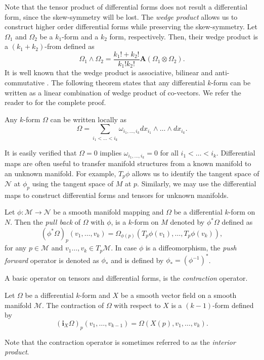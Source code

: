 Note that the tensor product of differential forms does not result a differential form, since the skew-symmetry will be lost. The \emph{wedge product} allows us to construct higher order differential forms while preserving the skew-symmetry. Let $\Omega_1$ and $\Omega_2$ be a $k_1$-form and a $k_2$ form, respectively. Then, their wedge product is a $(k_1+k_2)$-from defined as
\begin{equation} \label{eq:2.8}
	\Omega_1 \wedge \Omega_2 = \frac{k_1! + k_2!}{k_1!k_2!} \mathbf{A}(\Omega_1\otimes \Omega_2).
\end{equation}
It is well known that the wedge product is associative, bilinear and anti-commutative \cite{marsden2013introduction}. The following theorem states that any differential $k$-form can be written as a linear combination of wedge product of co-vectors. We refer the reader to \cite{} for the complete proof.
\begin{theorem} \label{theorem:2.2}
Any $k$-form $\Omega$ can be written locally as
\begin{equation} \label{eq:2.9}
	\Omega = \sum_{i_1<\dots<i_k} \omega_{i_1,\dots,i_k} dx_{i_1}\wedge\dots\wedge dx_{i_k}.
\end{equation}
\end{theorem}

It is easily verified that $\Omega = 0$ implies $\omega_{i_1,\dots,i_k} = 0$ for all $i_1<\dots<i_k$. Differential maps are often useful to transfer manifold structures from a known manifold to an unknown manifold. For example, $T_p\phi$ allows us to identify the tangent space of $\mathcal N$ at $\phi_p$ using the tangent space of $M$ at $p$. Similarly, we may use the differential maps to construct differential forms and tensors for unknown manifolds. 

\begin{definition}
Let $\phi:\mathcal M \to \mathcal N$ be a smooth manifold mapping and $\Omega$ be a differential $k$-form on $N$. Then the \emph{pull back} of $\Omega$ with $\phi$, is a $k$-form on $M$ denoted by $\phi^*\Omega$ defined as
\[
	(\phi^*\Omega)_p(v_1,\dots,v_k) = \Omega_{\phi(p)}( T_p\phi(v_1) , \dots , T_p\phi(v_k) ),
\]
for any $p\in \mathcal M$ and $v_1\dots,v_k \in T_p \mathcal M$. In case $\phi$ is a diffeomorphism, the \emph{push forward} operator is denoted as $\phi_*$ and is defined by $\phi_* = (\phi^{-1})^*$.
\end{definition}

A basic operator on tensors and differential forms, is the \emph{contraction} operator.
\begin{definition}
	Let $\Omega$ be a differential $k$-form and $X$ be a smooth vector field on a smooth manifold $\mathcal M$. The contraction of $\Omega$ with respect to $X$ is a $(k-1)$-form defined by
\[
	(\mathbf i_{X}\Omega)_p(v_1,\dots,v_{k-1}) = \Omega(X(p),v_1,\dots,v_k).
\]
\end{definition}
Note that the contraction operator is sometimes referred to as the \emph{interior product}.

